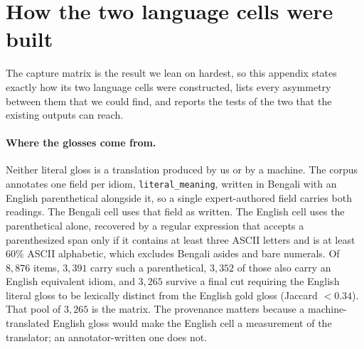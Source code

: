 \documentclass[11pt]{article}
\newcommand{\bangla}[1]{{\bn #1}}
\begin{document}










\section{How the two language cells were built}
\label{app:construction}

The capture matrix is the result we lean on hardest, so this appendix states
exactly how its two language cells were constructed, lists every asymmetry
between them that we could find, and reports the tests of the two that the
existing outputs can reach.

\paragraph{Where the glosses come from.} Neither literal gloss is a translation
produced by us or by a machine. The corpus annotates one field per idiom,
\texttt{literal\_meaning}, written in Bengali with an English parenthetical
alongside it, so a single expert-authored field carries both readings. The Bengali
cell uses that field as written. The English cell uses the parenthetical alone,
recovered by a regular expression that accepts a parenthesized span only if it
contains at least three ASCII letters and is at least $60\%$ ASCII alphabetic,
which excludes Bengali asides and bare numerals. Of $8{,}876$ items, $3{,}391$
carry such a parenthetical, $3{,}352$ of those also carry an English equivalent
idiom, and $3{,}265$ survive a final cut requiring the English literal gloss to be
lexically distinct from the English gold gloss (Jaccard $< 0.34$). That pool of
$3{,}265$ is the matrix. The provenance matters because a machine-translated
English gloss would make the English cell a measurement of the translator; an
annotator-written one does not.
\end{document}
